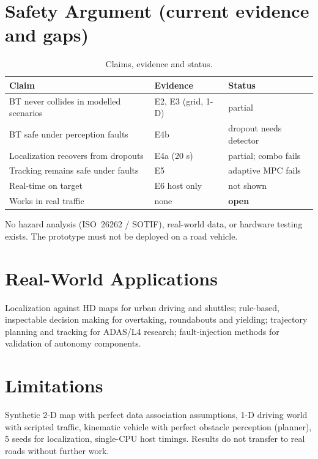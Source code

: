 \documentclass[conference]{IEEEtran}
\begin{document}
\section{Safety Argument (current evidence and gaps)}
\begin{table}[t]\centering\caption{Claims, evidence and status.}\small
\begin{tabular}{@{}p{2.6cm}p{3.3cm}p{1.5cm}@{}}\toprule Claim & Evidence & Status\\\midrule
BT never collides in modelled scenarios & E2, E3 (grid, 1-D) & partial\\
BT safe under perception faults & E4b & dropout needs detector\\
Localization recovers from dropouts & E4a (20 s) & partial; combo fails\\
Tracking remains safe under faults & E5 & adaptive MPC fails\\
Real-time on target & E6 host only & not shown\\
Works in real traffic & none & \textbf{open}\\\bottomrule\end{tabular}\end{table}
No hazard analysis (ISO~26262 / SOTIF), real-world data, or hardware testing exists. The prototype must not be deployed on a road vehicle.

\section{Real-World Applications}
Localization against HD maps for urban driving and shuttles; rule-based, inspectable decision making for overtaking, roundabouts and yielding; trajectory planning and tracking for ADAS/L4 research; fault-injection methods for validation of autonomy components.

\section{Limitations}\label{sec:limits}
Synthetic 2-D map with perfect data association assumptions, 1-D driving world with scripted traffic, kinematic vehicle with perfect obstacle perception (planner), 5 seeds for localization, single-CPU host timings. Results do not transfer to real roads without further work.
\end{document}
